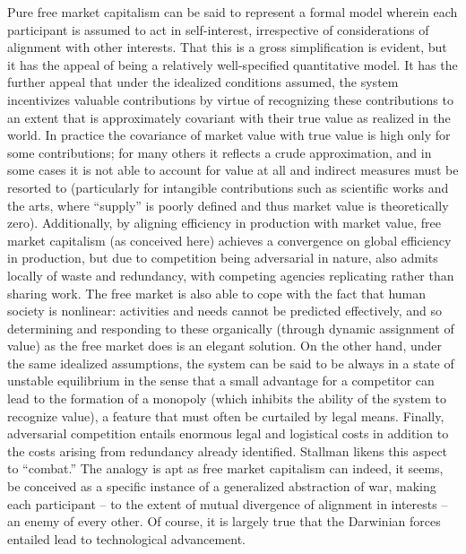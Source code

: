 \documentclass[pra,twocolumn,groupedaddress,10pt]{revtex4}
\theoremstyle{definition}
\begin{document}
Pure free market capitalism can be said to represent a formal model wherein each participant is assumed to act in self-interest, irrespective of considerations of alignment with other interests. That this is a gross simplification is evident, but it has the appeal of being a relatively well-specified quantitative model. It has the further appeal that under the idealized conditions assumed, the system incentivizes valuable contributions by virtue of recognizing these contributions to an extent that is approximately covariant with their true value as realized in the world. In practice the covariance of market value with true value is high only for some contributions; for many others it reflects a crude approximation, and in some cases it is not able to account for value at all and indirect measures must be resorted to (particularly for intangible contributions such as scientific works and the arts, where ``supply'' is poorly defined and thus market value is theoretically zero). Additionally, by aligning efficiency in production with market value, free market capitalism (as conceived here) achieves a convergence on global efficiency in production, but due to competition being adversarial in nature, also admits locally of waste and redundancy, with competing agencies replicating rather than sharing work. The free market is also able to cope with the fact that human society is nonlinear: activities and needs cannot be predicted effectively, and so determining and responding to these organically (through dynamic assignment of value) as the free market does is an elegant solution. On the other hand, under the same idealized assumptions, the system can be said to be always in a state of unstable equilibrium in the sense that a small advantage for a competitor can lead to the formation of a monopoly (which inhibits the ability of the system to recognize value), a feature that must often be curtailed by legal means. Finally, adversarial competition entails enormous legal and logistical costs in addition to the costs arising from redundancy already identified. Stallman\cite{stallmancombat} likens this aspect to ``combat.'' The analogy is apt as free market capitalism can indeed, it seems, be conceived as a specific instance of a generalized abstraction of war, making each participant -- to the extent of mutual divergence of alignment in interests -- an enemy of every other. Of course, it is largely true that the Darwinian forces entailed lead to technological advancement.
\end{document}
